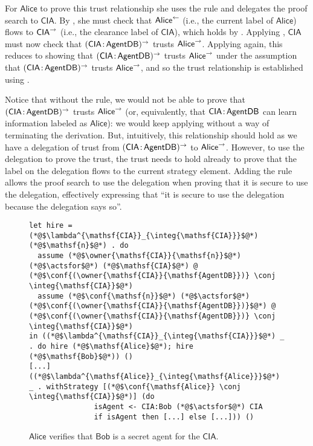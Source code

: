 For $\mathsf{Alice}$ to prove this trust relationship she uses the  rule and delegates the proof search to $\mathsf{CIA}$. By , she must check that $\mathsf{Alice}^{\leftarrow}$ (i.e., the current label of $\mathsf{Alice}$) flows to $\mathsf{CIA}^{\rightarrow}$ (i.e., the clearance label of $\mathsf{CIA}$), which holds by . Applying , $\mathsf{CIA}$ must now check that $(\mathsf{CIA} \colon \!\mathsf{AgentDB})^{\rightarrow}$ trusts $\mathsf{Alice}^{\rightarrow}$. Applying  again, this reduces to showing that $(\mathsf{CIA} \colon \!\mathsf{AgentDB})^{\rightarrow}$ trusts $\mathsf{Alice}^{\rightarrow}$ under the assumption that $(\mathsf{CIA} \colon \!\mathsf{AgentDB})^{\rightarrow}$ trusts $\mathsf{Alice}^{\rightarrow}$, and so the trust relationship is established using .

Notice that without the  rule, we would not be able to prove that $(\mathsf{CIA} \colon \!\mathsf{AgentDB})^{\rightarrow}$ trusts $\mathsf{Alice}^{\rightarrow}$ (or, equivalently, that $\mathsf{CIA} \colon \!\mathsf{AgentDB}$ can learn information labeled as $\mathsf{Alice}$): we would keep applying  without a way of terminating the derivation. But, intuitively, this relationship should hold as we have a delegation of trust from $(\mathsf{CIA} \colon \!\mathsf{AgentDB})^{\rightarrow}$ to $\mathsf{Alice}^{\rightarrow}$. However, to use the delegation to prove the trust, the trust needs to hold already to prove that the label on the delegation flows to the current strategy element. Adding the  rule allows the proof search to use the delegation when proving that it is secure to use the delegation, effectively expressing that ``it is secure to use the delegation because the delegation says so''.

\begin{figure}
\centering
\begin{lstlisting}
let hire = (*@$\lambda^{\mathsf{CIA}}_{\integ{\mathsf{CIA}}}$@*) (*@$\mathsf{n}$@*) . do
  assume (*@$\owner{\mathsf{CIA}}{\mathsf{n}}$@*) (*@$\actsfor$@*) (*@$\mathsf{CIA}$@*) @ (*@$\conf{(\owner{\mathsf{CIA}}{\mathsf{AgentDB}})} \conj \integ{\mathsf{CIA}}$@*)
  assume (*@$\conf{\mathsf{n}}$@*) (*@$\actsfor$@*) (*@$\conf{(\owner{\mathsf{CIA}}{\mathsf{AgentDB}})}$@*) @ (*@$\conf{(\owner{\mathsf{CIA}}{\mathsf{AgentDB}})} \conj \integ{\mathsf{CIA}}$@*)
in ((*@$\lambda^{\mathsf{CIA}}_{\integ{\mathsf{CIA}}}$@*) _ . do hire (*@$\mathsf{Alice}$@*); hire (*@$\mathsf{Bob}$@*)) ()
[...]
((*@$\lambda^{\mathsf{Alice}}_{\integ{\mathsf{Alice}}}$@*) _ . withStrategy [(*@$\conf{\mathsf{Alice}} \conj \integ{\mathsf{CIA}}$@*)] (do
               isAgent <- CIA:Bob (*@$\actsfor$@*) CIA
               if isAgent then [...] else [...])) ()
\end{lstlisting}
\caption{$\mathsf{Alice}$ verifies that $\mathsf{Bob}$ is a secret agent for the $\mathsf{CIA}$.}
\label{fig:govt-alice-checks-bob}
\end{figure}